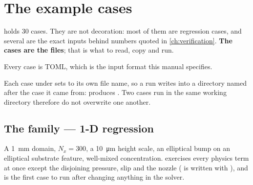 \chapter{The example cases}
\label{ch:cases}

 holds 30 cases. They are not decoration: most of them are
regression cases, and several are the exact inputs behind numbers quoted in
\cref{ch:verification}. \textbf{The cases are the  files}; that is
what to read, copy and run.

Every case is TOML, which is the input format this manual specifies.

\begin{note}
  Each case under  sets  to its own file name, so a
  run writes into a directory named after the case it came from:
   produces . Two cases
  run in the same working directory therefore do not overwrite one another.
\end{note}

\section{The  family --- 1-D regression}
\label{sec:cases:case01}

A \SI{1}{\milli\metre} domain, $N_x = 300$, a \SI{10}{\micro\metre} height
scale, an elliptical bump on an elliptical substrate feature, well-mixed
concentration.  exercises every physics term at once
except the disjoining pressure, slip and the nozzle ( is written
with ), and is the first case to run after changing
anything in the solver.

